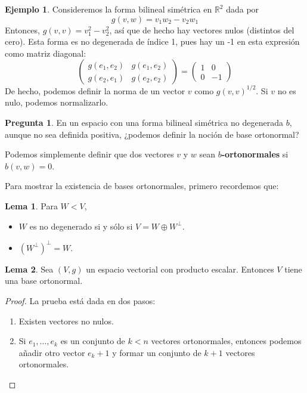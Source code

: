 \documentclass[spanish]{book}
\theoremstyle{definition}
\newtheorem*{lema}{Lema}
\newtheorem*{ejem}{Ejemplo}
\newtheorem*{pregunta}{Pregunta}
\newcommand{\R}{\mathbb{R}}
\begin{document}
	\begin{ejem}
		Consideremos la forma bilineal simétrica en $\R^2$ dada por
		\[g(v,w)=v_1w_2-v_2w_1\]
		Entonces, $g(v,v)=v_1^2-v_2^2$, así que de hecho hay vectores nulos (distintos del cero). Esta forma es no degenerada de índice 1, pues hay un -1 en esta expresión como matriz diagonal:
		\[\begin{pmatrix}
			g(e_1,e_2)&g(e_1,e_2)\\
			g(e_2,e_1)&g(e_2,e_2)
		\end{pmatrix}=\begin{pmatrix}
		1&0\\
		0&-1
		\end{pmatrix}\]
		De hecho, podemos definir la norma de un vector $v$ como $g(v,v)^{1/2}$. Si $v$ no es nulo, podemos normalizarlo.
	\end{ejem}
	\begin{pregunta}
		En un espacio con una forma bilineal simétrica no degenerada $b$, aunque no sea definida positiva, ¿podemos definir la noción de base ortonormal? 
	\end{pregunta}
	Podemos simplemente definir que dos vectores $v$ y $w$ sean \textbf{$b$-ortonormales} si $b(v,w)=0$.
	
	Para mostrar la existencia de bases ortonormales, primero recordemos que:
	\begin{lema}
		Para $W<V$,
		\begin{itemize}
			\item  $W$ es no degenerado si y sólo si $V=W\oplus W^\perp$.
			\item $(W^\perp)^\perp=W$.
		\end{itemize}
	\end{lema}
	\begin{lema}
		Sea $(V,g)$ un espacio vectorial con producto escalar. Entonces $V$ tiene una base ortonormal.
	\end{lema}
	\begin{proof}
		La prueba está dada en dos pasos:
		\begin{enumerate}
			\item Existen vectores no nulos.
			\item Si $e_1,\ldots,e_k$ es un conjunto de $k<n$ vectores ortonormales, entonces podemos añadir otro vector $e_k+1$ y formar un conjunto de $k+1$ vectores ortonormales.
			
		\end{enumerate}
	\end{proof}
	
\end{document}
